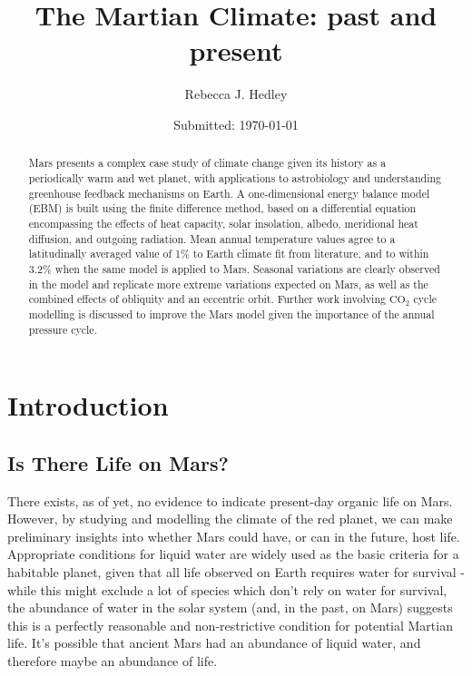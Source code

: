 \documentclass[12pt,onecolumn]{revtex4-2}    %
\begin{document}
\title{The Martian Climate: past and present} 
\date{Submitted: \today{}}
\author{Rebecca J. Hedley}


\begin{abstract}              

Mars presents a complex case study of climate change given its history as a periodically warm and wet planet, with applications to astrobiology and understanding greenhouse feedback mechanisms on Earth. A one-dimensional energy balance model (EBM) is built using the finite difference method, based on a differential equation encompassing the effects of heat capacity, solar insolation, albedo, meridional heat diffusion, and outgoing radiation. Mean annual temperature values agree to a latitudinally averaged value of 1\% to Earth climate fit from literature, and to within 3.2\% when the same model is applied to Mars. Seasonal variations are clearly observed in the model and replicate more extreme variations expected on Mars, as well as the combined effects of obliquity and an eccentric orbit. Further work involving $\mathrm{CO_2}$ cycle modelling is discussed to improve the Mars model given the importance of the annual pressure cycle.

\end{abstract}

\maketitle

\thispagestyle{plain} %

\newpage

\tableofcontents

\newpage

\section{Introduction} 

\subsection{Is There Life on Mars?}

There exists, as of yet, no evidence to indicate present-day organic life on Mars. However, by studying and modelling the climate of the red planet, we can make preliminary insights into whether Mars could have, or can in the future, host life. Appropriate conditions for liquid water are widely used as the basic criteria for a habitable planet, given that all life observed on Earth requires water for survival - while this might exclude a lot of species which don't rely on water for survival, the abundance of water in the solar system (and, in the past, on Mars) suggests this is a perfectly reasonable and non-restrictive condition for potential Martian life. It's possible that ancient Mars had an abundance of liquid water, and therefore maybe an abundance of life.
\end{document}
